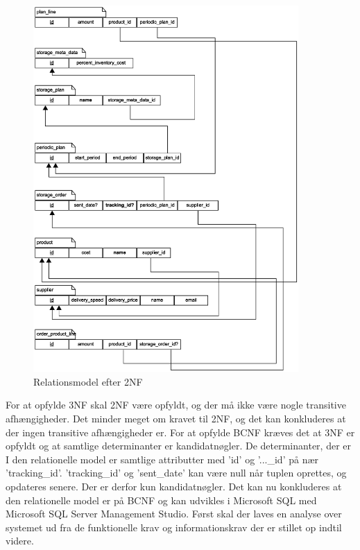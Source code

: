 \begin{figure}[H]
    \centering
    \includegraphics[width=0.9\textwidth]{figures/krav/relation_model_1th_normalization.eps}
    \caption{Relationsmodel efter 2NF}
    \label{fig:relational_model_1}
\end{figure}

For at opfylde 3NF skal 2NF være opfyldt, og der må ikke være nogle transitive afhængigheder\cite{DatabaseSystems}. Det minder meget om kravet til 2NF, og det kan konkluderes at der ingen transitive afhængigheder er.
For at opfylde BCNF kræves det at 3NF er opfyldt og at samtlige determinanter er kandidatnøgler. De determinanter, der er I den relationelle model er samtlige attributter med 'id' og '...\_id' på nær 'tracking\_id'. 'tracking\_id' og 'sent\_date' kan være null når tuplen oprettes, og opdateres senere. Der er derfor kun kandidatnøgler.
Det kan nu konkluderes at den relationelle model er på BCNF og kan udvikles i Microsoft SQL med Microsoft SQL Server Management Studio\cite{MSSQL}. Først skal der laves en analyse over systemet ud fra de funktionelle krav og informationskrav der er stillet op indtil videre. 

